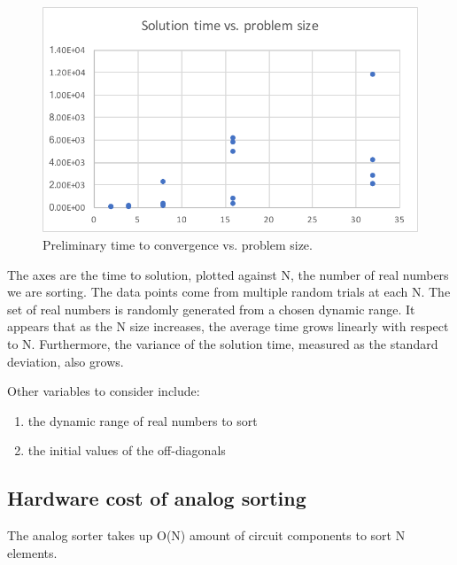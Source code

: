 \begin{figure}
\centering
\includegraphics[width=\columnwidth]{../data/ode_time_vs_problem_size.pdf}
\caption{Preliminary time to convergence vs. problem size.}
\end{figure}

The axes are the time to solution, plotted against N, the number of real numbers we are sorting.
The data points come from multiple random trials at each N.
The set of real numbers is randomly generated from a chosen dynamic range.
It appears that as the N size increases, the average time grows linearly with respect to N.
Furthermore, the variance of the solution time, measured as the standard deviation, also grows.

Other variables to consider include:
\begin{enumerate}
\item the dynamic range of real numbers to sort
\item the initial values of the off-diagonals
\end{enumerate}

\subsection{Hardware cost of analog sorting}

The analog sorter takes up O(N) amount of circuit components to sort N elements.



